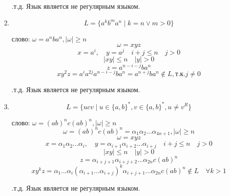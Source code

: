 \documentclass[a4paper, 12pt]{article}
\begin{document}
\begin{enumerate}
.т.д. Язык является не регулярным языком.

\item$$L = \{ a^kb^ma^n \mid k = n \vee m > 0 \}$$

 слово: $ \omega = a^nba^n, |\omega| \geq n $
$$ \omega = xyz $$
$$ x = a^i, \quad y=a^j \quad i + j \leq n \quad j > 0 $$
$$ |xy| \leq n \quad |y| > 0 $$
$$ z=a^{n-i-j}ba^n $$
$$ xy^2z = a^ia^{2j}a^{n-i-j}ba^n = a^{n+j}ba^n \notin L, \text{т.к.} j \neq 0 $$

.т.д. Язык является не регулярным языком.

\item$$L = \{ ucv \mid u \in \{a, b\}^*, v \in \{a, b\}^*, u \neq v^R \}$$

 слово: $ \omega = (ab)^nc(ab)^n, |\omega| \geq n $
$$ \omega = (ab)^nc(ab)^n=\alpha_1\alpha_2...\alpha_{4n+1}, |\omega| \geq n $$
$$ \omega = xyz $$
$$ x = \alpha_1\alpha_2...\alpha_i, \quad y=\alpha_{i+1}\alpha_{i+2}...\alpha_{i+j} \quad i + j \leq n \quad j > 0 $$
$$ |xy| \leq n \quad |y| > 0 $$
$$ z=\alpha_{i+j+1}\alpha_{i+j+2}...\alpha_{2n}c(ab)^n $$
$$ xy^kz = \alpha_1...\alpha_i(\alpha_{i+1}...\alpha_{i+j})^k\alpha_{i+j+1}...\alpha_{2n}c(ab)^n \notin L \quad \forall k > 1 $$

.т.д. Язык является не регулярным языком.

\end{enumerate}
\end{document}
